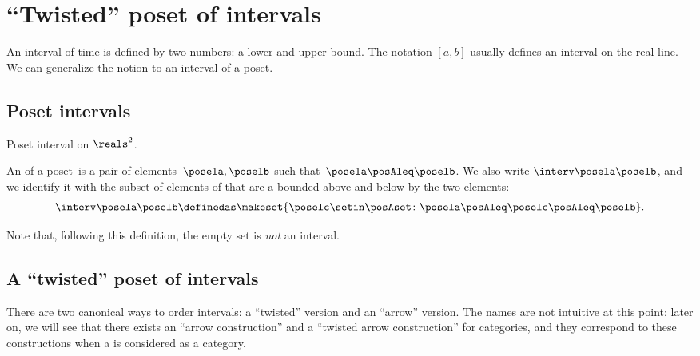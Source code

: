 
\section{``Twisted'' poset of intervals}

An interval of time is defined by two numbers: a lower and upper bound.
The notation $[a,b]$ usually defines an interval on the real line.
We can generalize the notion to an interval of a poset.

\subsection{Poset intervals}
\begin{marginfigure}
    \centering
    \caption{Poset interval on $\reals^2$.}
    \label{fig:int_posets}
\end{marginfigure}

\begin{definition}[Interval]
    \label{def:interval}
    An  of a poset~\posA is a pair of elements~$\posela, \poselb$ such that~$\posela \posAleq \poselb$.
    We also write $\interv \posela \poselb$, and we identify it with the subset of elements of \posA that are a bounded above and below by the two elements:
    \begin{equation}\label{eq:interval}
        \interv \posela \poselb
        \definedas
        \makeset{
            \poselc \setin \posAset \colon
            \posela \posAleq \poselc \posAleq \poselb
        }.
    \end{equation}
\end{definition}

Note that, following this definition, the empty set is \emph{not} an interval.

\subsection{A ``twisted''  poset of  intervals}

There are two canonical ways to order  intervals: a ``twisted'' version and an ``arrow'' version.
The names are not intuitive at this point: later on, we will see that there exists an ``arrow construction'' and a ``twisted arrow construction'' for categories, and they correspond to these constructions when a  is considered as a category.

